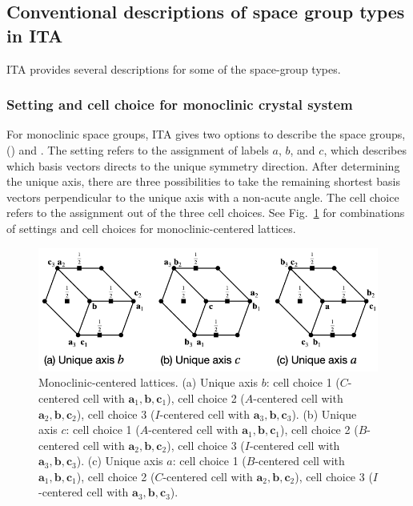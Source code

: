 
\subsection{\label{sec:space-group-alternatives}Conventional descriptions of space group types in ITA}

ITA provides several descriptions for some of the space-group types.

\subsubsection{Setting and cell choice for monoclinic crystal system}

For monoclinic space groups, ITA gives two options to describe the space groups,  () and .
The setting refers to the assignment of labels $a$, $b$, and $c$, which describes which basis vectors directs to the unique symmetry direction.
After determining the unique axis, there are three possibilities to take the remaining shortest basis vectors perpendicular to the unique axis with a non-acute angle.
The cell choice refers to the assignment out of the three cell choices.
See Fig.~\ref{fig:monoclinic-choices} for combinations of settings and cell choices for monoclinic-centered lattices.

\begin{figure}[htb]
  \centering
  \includegraphics[width=\textwidth]{figure/fig_monoclinic_settings_cell_choices.png}
  \caption{
    Monoclinic-centered lattices.
    (a) Unique axis $b$:
      cell choice 1 ($C$-centered cell with $\bm{a}_{1}, \bm{b}, \bm{c}_{1}$),
      cell choice 2 ($A$-centered cell with $\bm{a}_{2}, \bm{b}, \bm{c}_{2}$),
      cell choice 3 ($I$-centered cell with $\bm{a}_{3}, \bm{b}, \bm{c}_{3}$).
    (b) Unique axis $c$:
      cell choice 1 ($A$-centered cell with $\bm{a}_{1}, \bm{b}, \bm{c}_{1}$),
      cell choice 2 ($B$-centered cell with $\bm{a}_{2}, \bm{b}, \bm{c}_{2}$),
      cell choice 3 ($I$-centered cell with $\bm{a}_{3}, \bm{b}, \bm{c}_{3}$).
    (c) Unique axis $a$:
      cell choice 1 ($B$-centered cell with $\bm{a}_{1}, \bm{b}, \bm{c}_{1}$),
      cell choice 2 ($C$-centered cell with $\bm{a}_{2}, \bm{b}, \bm{c}_{2}$),
      cell choice 3 ($I$-centered cell with $\bm{a}_{3}, \bm{b}, \bm{c}_{3}$).
  }
  \label{fig:monoclinic-choices}
\end{figure}


